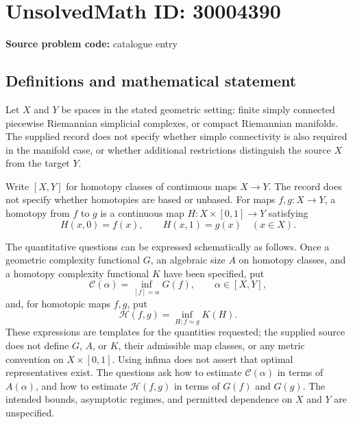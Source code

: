 \documentclass[11pt]{article}
\begin{document}
\section*{UnsolvedMath ID: 30004390}
\textbf{Source problem code:} catalogue entry
\subsection{Definitions and mathematical statement}
Let \(X\) and \(Y\) be spaces in the stated geometric setting: finite simply connected piecewise Riemannian simplicial complexes, or compact Riemannian manifolds. The supplied record does not specify whether simple connectivity is also required in the manifold case, or whether additional restrictions distinguish the source \(X\) from the target \(Y\).

Write \([X,Y]\) for homotopy classes of continuous maps \(X\to Y\). The record does not specify whether homotopies are based or unbased. For maps \(f,g\colon X\to Y\), a homotopy from \(f\) to \(g\) is a continuous map \(H\colon X\times[0,1]\to Y\) satisfying
\[
H(x,0)=f(x),\qquad H(x,1)=g(x)\quad(x\in X).
\]

The quantitative questions can be expressed schematically as follows. Once a geometric complexity functional \(G\), an algebraic size \(A\) on homotopy classes, and a homotopy complexity functional \(K\) have been specified, put
\[
\mathcal C(\alpha)=\inf_{[f]=\alpha}G(f),\qquad \alpha\in[X,Y],
\]
and, for homotopic maps \(f,g\), put
\[
\mathcal H(f,g)=\inf_{H\colon f\simeq g}K(H).
\]
These expressions are templates for the quantities requested; the supplied source does not define \(G\), \(A\), or \(K\), their admissible map classes, or any metric convention on \(X\times[0,1]\). Using infima does not assert that optimal representatives exist. The questions ask how to estimate \(\mathcal C(\alpha)\) in terms of \(A(\alpha)\), and how to estimate \(\mathcal H(f,g)\) in terms of \(G(f)\) and \(G(g)\). The intended bounds, asymptotic regimes, and permitted dependence on \(X\) and \(Y\) are unspecified.
\end{document}
